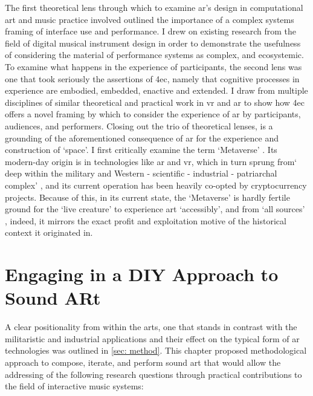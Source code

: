 The first theoretical lens through which to examine \gls{ar}'s design in computational art and music practice involved outlined the importance of a complex systems framing of interface use and performance. I drew on existing research from the field of digital musical instrument design \citep{magnusson2009a,discipio2003,essl2006,armstrong2006,hayes2019,chevalier2018} in order to demonstrate the usefulness of considering the material of performance systems as complex, and ecosystemic. To examine what happens in the experience of participants, the second lens was one that took seriously the assertions of \gls{4ec}, namely that cognitive processes in experience are embodied, embedded, enactive and extended. I draw from multiple disciplines of similar theoretical and practical work in \gls{vr} and \gls{ar} to show how \gls{4ec} offers a novel framing by which to consider the experience of \gls{ar} by participants, audiences, and performers. Closing out the trio of theoretical lenses, is a grounding of the aforementioned consequence of \gls{ar} for the experience and construction of `space'. I first critically examine the term `Metaverse' \citep{stephenson1992}. Its modern-day origin is in technologies like \gls{ar} and \gls{vr}, which in turn sprung from` deep within the military and Western - scientific - industrial - patriarchal complex' \citep{davies2004}, and its current operation has been heavily co-opted by cryptocurrency projects. Because of this, in its current state, the `Metaverse' is hardly fertile ground for the `live creature' to experience art `accessibly', and from `all sources' \citep{dewey1934,leddy2021}, indeed, it mirrors the exact profit and exploitation motive of the historical context it originated in.



\section{Engaging in a DIY Approach to Sound ARt}\label{sec: discussion-method}
A clear positionality from within the arts, one that stands in contrast with the militaristic and industrial applications and their effect on the typical form of \gls{ar} technologies was outlined in \autoref{sec: method}. This chapter proposed methodological approach to compose, iterate, and perform sound \gls{art} that would allow the addressing of the following research questions through practical contributions to the field of interactive music systems: 


